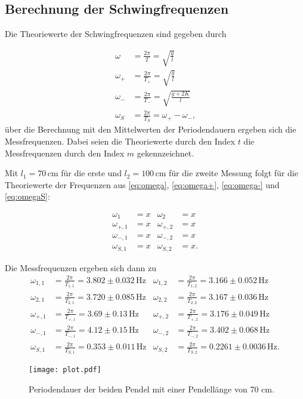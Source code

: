 \newpage

\subsection{Berechnung der Schwingfrequenzen}

Die Theoriewerte der Schwingfrequenzen sind gegeben durch

\begin{align}
  \omega   & = \frac{2π}{T}     =   \sqrt{\frac{g}{l}} \label{eq:omega} \\
  \omega_+ & = \frac{2π}{T_+} =   \sqrt{\frac{g}{l}} \label{eq:omega+} \\
  \omega_- & = \frac{2π}{T_-} =\sqrt{\frac{g+2K}{l}} \label{eq:omega-} \\
  \omega_S & = \frac{2π}{T_S} =  \omega_+ -\omega_- \label{eq:omegaS} \text{,}
\end{align}
über die Berechnung mit den Mittelwerten der Periodendauern ergeben sich die Messfrequenzen. Dabei seien die Theoriewerte durch den Index $t$
die Messfrequenzen durch den Index $m$ gekennzeichnet.

Mit $l_1=70 \, \unit{\centi\meter}$ für die erste und $l_2= 100 \, \unit{\centi\meter}$ für die zweite Messung folgt für die Theoriewerte der Frequenzen aus \eqref{eq:omega}, \eqref{eq:omega+}, \eqref{eq:omega-} und \eqref{eq:omegaS}:

\begin{align}
\omega_1 & = x & \omega_2 & = x \nonumber\\
\omega_{+,1} & = x & \omega_{+,2} & = x \nonumber\\
\omega_{-,1} & = x & \omega_{-,2} & = x \nonumber\\
\omega_{S,1} & = x & \omega_{S,2} & = x \nonumber \text{.}
\end{align}

Die Messfrequenzen ergeben sich dann zu
\begin{align}
\omega_{1,1} & = \frac{2π}{T_{1,1}}   = 3.802 \pm 0.032     \,\unit{\hertz}& \omega_{1,2} & =  \frac{2π}{T_{1,2}}         = 3.166   \pm 0.052 \,\unit{\hertz}   \nonumber\\
\omega_{2,1} & = \frac{2π}{T_{2,1}}  = 3.720 \pm 0.085      \,\unit{\hertz}& \omega_{2,2} & =  \frac{2π}{T_{2,2}}         = 3.167   \pm 0.036 \,\unit{\hertz}   \nonumber\\
\omega_{+,1} & = \frac{2π}{T_{+,1}}  = 3.69 \pm 0.13        \,\unit{\hertz}& \omega_{+,2} & =  \frac{2π}{T_{+,2}}         = 3.176   \pm 0.049 \,\unit{\hertz}   \nonumber\\
\omega_{-,1} & = \frac{2π}{T_{-,1}}  = 4.12 \pm 0.15        \,\unit{\hertz}& \omega_{-,2} & =  \frac{2π}{T_{-,2}}         = 3.402   \pm 0.068 \,\unit{\hertz}   \nonumber\\
\omega_{S,1} & = \frac{2π}{T_{S,1}} = 0.353 \pm 0.011       \,\unit{\hertz}& \omega_{S,2} & =   \frac{2π}{T_{S,2}}        = 0.2261  \pm 0.0036 \,\unit{\hertz} \nonumber \text{.}

\end{align} 



\begin{figure}
  \centering
  \texttt{[image: plot.pdf]}
  \caption{Periodendauer der beiden Pendel mit einer Pendellänge von 70 cm.}
  \label{fig:plot}
\end{figure}


